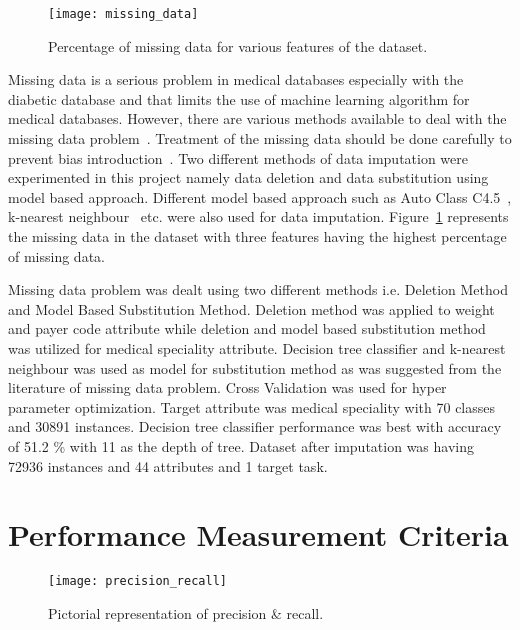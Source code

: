 \documentclass[conference]{IEEEtran}
\begin{document}
\begin{figure}[htpb]
	\centering
	\texttt{[image: missing\_data]}
	\caption{Percentage of missing data for various features of the dataset.}
	\label{fig:missing_data}
\end{figure}


Missing data is a serious problem in medical databases especially with the diabetic database and that limits the use of machine learning algorithm for medical databases. However, there are various methods available to deal with the missing data problem~\cite{imputation-96}. Treatment of the missing data should be done carefully to prevent bias introduction~\cite{gustavo-2003}. Two different methods of data imputation were experimented in this project namely data deletion and data substitution using model based approach. Different model based approach such as Auto Class C4.5~\cite{lakshminarayan-1999}, k-nearest neighbour~\cite{gustavo-2003} etc. were also used for data imputation. Figure~\ref{fig:missing_data} represents the missing data in the dataset with three features having the highest percentage of missing data.

Missing data problem was dealt using two different methods i.e. Deletion Method and Model Based Substitution Method. Deletion method was applied to weight and payer code attribute while deletion and model based substitution method was utilized for medical speciality attribute. Decision tree classifier and k-nearest neighbour was used as model for substitution method as was suggested from the literature of missing data problem. Cross Validation was used for hyper parameter optimization. Target attribute was medical speciality with 70 classes and 30891 instances. Decision tree classifier performance was best with accuracy of 51.2 \% with 11 as the depth of tree. Dataset after imputation was having 72936 instances and 44 attributes and 1 target task.


\section{Performance Measurement Criteria}

\begin{figure}[htpb]
	\centering
	\texttt{[image: precision\_recall]}
	\caption{Pictorial representation of precision \& recall.}
	\label{fig:precision_recall}
\end{figure}
\end{document}
